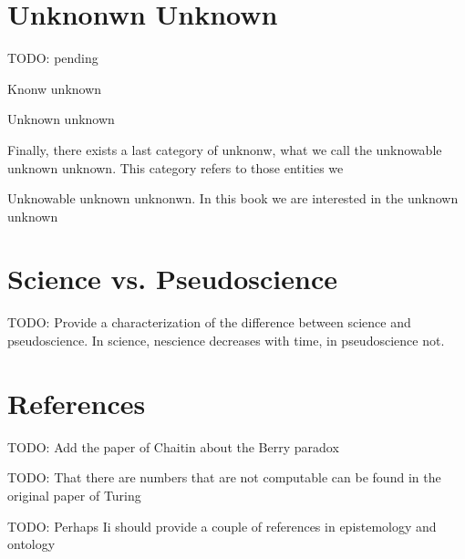 %
%

\section{Unknonwn Unknown}

{\color{red} TODO: pending}

Knonw unknown

Unknown unknown

Finally, there exists a last category of unknonw, what we call the unknowable unknown unknown. This category refers to those entities we

Unknowable unknown unknonwn. In this book we are interested in the unknown unknown

%
%

\section{Science vs. Pseudoscience}

{\color{red} TODO: Provide a characterization of the difference between science and pseudoscience. In science, nescience decreases with time, in pseudoscience not.}

%
%

\section*{References}

{\color{red} TODO: Add the paper of Chaitin about the Berry paradox}

{\color{red} TODO: That there are numbers that are not computable can be found in the original paper of Turing}

{\color{red} TODO: Perhaps Ii should provide a couple of references in epistemology and ontology}

